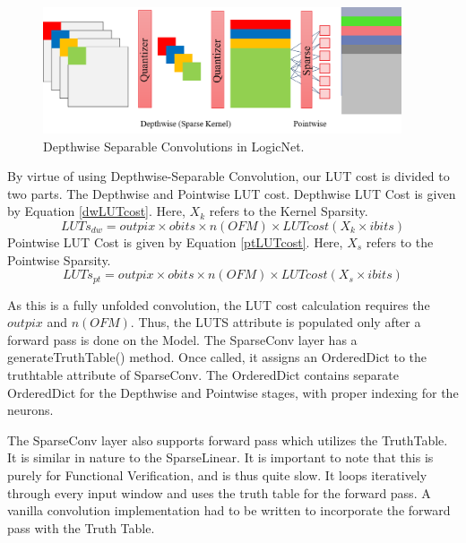 \begin{figure}[h]
    \centering
    \includegraphics[width=300pt]{figures/bison/dwsepconv.png}
    \caption{Depthwise Separable Convolutions in LogicNet.}
    \label{fig:dwsepconv}
\end{figure}

By virtue of using Depthwise-Separable Convolution, our LUT cost is divided to two parts. The Depthwise and Pointwise LUT cost.
Depthwise LUT Cost is given by Equation \eqref{dwLUTcost}. Here, $X_{k}$ refers to the Kernel Sparsity.
\begin{equation}
    LUTs_{dw} = outpix\times obits\times n(OFM)\times LUTcost(X_{k}\times ibits)
    \label{dwLUTcost}
\end{equation}
Pointwise LUT Cost is given by Equation \eqref{ptLUTcost}. Here, $X_{s}$ refers to the Pointwise Sparsity.
\begin{equation}
    LUTs_{pt} = outpix\times obits\times n(OFM)\times LUTcost(X_{s}\times ibits)
    \label{ptLUTcost}
\end{equation}

As this is a fully unfolded convolution, the LUT cost calculation requires the $outpix$ and $n(OFM)$. Thus, the LUTS attribute is populated only after a forward pass is done on the Model.
The SparseConv layer has a generateTruthTable() method. Once called, it assigns an OrderedDict to the truthtable attribute of SparseConv. The OrderedDict contains separate OrderedDict for the Depthwise and Pointwise stages, with proper indexing for the neurons. 

The SparseConv layer also supports forward pass which utilizes the TruthTable. It is similar in nature to the SparseLinear. It is important to note that this is purely for Functional Verification, and is thus quite slow. It loops iteratively through every input window and uses the truth table for the forward pass. A vanilla convolution implementation had to be written to incorporate the forward pass with the Truth Table.

